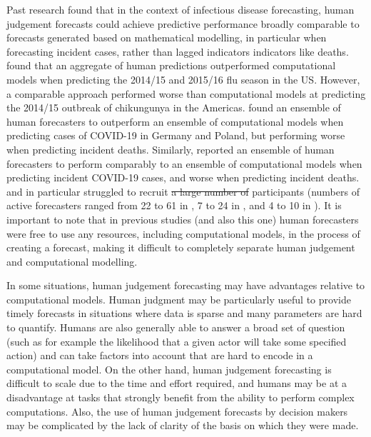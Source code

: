 \documentclass[10pt,a4paper,twocolumn]{article}
\providecommand{\DIFaddtex}[1]{{\protect\color{blue}\uwave{#1}}} %
\providecommand{\DIFdeltex}[1]{{\protect\color{red}\sout{#1}}}                      %
\providecommand{\DIFaddbegin}{} %
\providecommand{\DIFaddend}{} %
\providecommand{\DIFdelbegin}{} %
\providecommand{\DIFdelend}{} %
\providecommand{\DIFadd}[1]{\texorpdfstring{\DIFaddtex{#1}}{#1}} %
\providecommand{\DIFdel}[1]{\texorpdfstring{\DIFdeltex{#1}}{}} %
\begin{document}
Past research found that in the context of infectious disease forecasting, human judgement forecasts could achieve predictive performance broadly comparable to forecasts generated based on mathematical modelling, in particular when forecasting incident cases, rather than lagged indicators indicators like deaths. \citet{farrowHumanJudgmentApproach2017} found that an aggregate of human predictions outperformed computational models when predicting the 2014/15 and 2015/16 flu season in the US. However, a comparable approach performed worse than computational models at predicting the 2014/15 outbreak of chikungunya in the Americas. 
\citet{bosseComparingHumanModelbased2022} found an ensemble of human forecasters to outperform an ensemble of computational models when predicting cases of COVID-19 in Germany and Poland, but performing worse when predicting incident deaths. Similarly, \citet{mcandrewChimericForecastingCombining2022} reported an ensemble of human forecasters to perform comparably to an ensemble of computational models when predicting incident COVID-19 cases, and worse when predicting incident deaths. \citet{farrowHumanJudgmentApproach2017} and in particular \citet{bosseComparingHumanModelbased2022} struggled to recruit \DIFdelbegin \DIFdel{a large number of }\DIFdelend \DIFaddbegin \DIFadd{many }\DIFaddend participants (numbers of active forecasters ranged from 22 to 61 in \citet{mcandrewChimericForecastingCombining2022}, 7 to 24 in \citet{farrowHumanJudgmentApproach2017}, and 4 to 10 in \citet{bosseComparingHumanModelbased2022}). 
It is important to note that in previous studies (and also this one) human forecasters were free to use any resources, including computational models, in the process of creating a forecast, making it difficult to completely separate human judgement and computational modelling. 

In some situations, human judgement forecasting may have advantages relative to computational models. Human judgment may be particularly useful to provide timely forecasts in situations where data is sparse and many parameters are hard to quantify. Humans are also generally able to answer a broad set of question (such as for example the likelihood that a given actor will take some specified action) and can take factors into account that are hard to encode in a computational model. On the other hand, human judgement forecasting is difficult to scale due to the time and effort required, and humans may be at a disadvantage at tasks that strongly benefit from the ability to perform complex computations. Also, the use of human judgement forecasts by decision makers may be complicated by the lack of clarity of the basis on which they were made.
\end{document}
